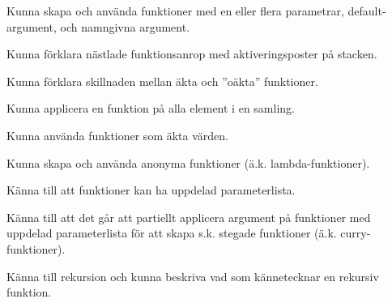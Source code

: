 
\item Kunna skapa och använda funktioner med en eller flera parametrar, default-argument, och namngivna argument.
\item Kunna förklara nästlade funktionsanrop med aktiveringsposter på stacken.
\item Kunna förklara skillnaden mellan äkta och ''oäkta'' funktioner.
\item Kunna applicera en funktion på alla element i en samling.

\item Kunna använda funktioner som äkta värden.
\item Kunna skapa och använda anonyma funktioner (ä.k. lambda-funktioner).

\item Känna till att funktioner kan ha uppdelad parameterlista.
\item Känna till att det går att partiellt applicera argument på funktioner med uppdelad parameterlista för att skapa s.k. stegade funktioner (ä.k. curry-funktioner).

\item Känna till rekursion och kunna beskriva vad som kännetecknar en rekursiv funktion.
